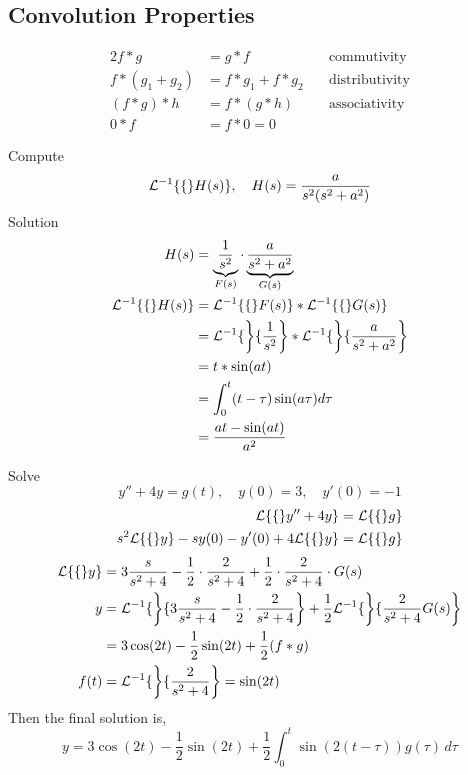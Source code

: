\documentclass[diffeq.tex]{subfiles}
\begin{document}
    \subsection{Convolution Properties}
    \begin{alignat}{2}
        f * g &= g * f & \quad\text{commutivity}\\
        f * (g_{1} + g_{2}) &= f * g_{1} + f * g_{2} & \quad\text{distributivity}\\
        (f * g) * h &= f * (g * h) & \quad\text{associativity}\\
        0 * f &= f * 0 = 0&
    \end{alignat}
    \begin{example}
        Compute
        \begin{equation}
            \mathcal{L}^{-1}\{\{\}H(s)\},\quad H(s) = \frac{a}{s^{2}(s^{2} + a^{2})}
        \end{equation}
        Solution
        \begin{alignat}{1}
            H(s) &= \underbrace{\frac{1}{s^{2}}}_{F(s)} \cdot \underbrace{\frac{a}{s^{2} + a^{2}}}_{G(s)}\\
            \mathcal{L}^{-1}\{\{\}H(s)\} &= \mathcal{L}^{-1}\{\{\}F(s)\} * \mathcal{L}^{-1}\{\{\}G(s)\}\\
            &= \mathcal{L}^{-1}\{\left\}\{\frac{1}{s^{2}}\right\}*\mathcal{L}^{-1}\{\left\}\{\frac{a}{s^{2} + a^{2}}\right\}\\
            &= t * \sin(at)\\
            &= \int_{0}^{t}(t-\tau)\sin(a\tau)d\tau\\
            &= \frac{at-\sin(at)}{a^{2}}
        \end{alignat}
    \end{example}
    \begin{example}
        Solve
        \begin{equation}
            y'' + 4y = g(t),\quad y(0) = 3,\quad y'(0) = -1
        \end{equation}
        \begin{alignat}{1}
            \mathcal{L}\{\{\}y'' + 4y\} &= \mathcal{L}\{\{\}g\}\\
            s^{2}\mathcal{L}\{\{\}y\} - sy(0) - y'(0) + 4\mathcal{L}\{\{\}y\} &= \mathcal{L}\{\{\}g\}
        \end{alignat}
        \begin{alignat}{1}
            \mathcal{L}\{\{\}y\} &= 3\frac{s}{s^{2} + 4} - \frac{1}{2}\cdot\frac{2}{s^{2} + 4} + \frac{1}{2} \cdot \frac{2}{s^{2} + 4} \cdot G(s)\\
            y &= \mathcal{L}^{-1}\{\left\}\{3\frac{s}{s^{2} + 4} - \frac{1}{2}\cdot\frac{2}{s^{2} + 4}\right\} + \frac{1}{2}\mathcal{L}^{-1}\{\left\}\{\frac{2}{s^{2} + 4}G(s)\right\}\\
            &= 3\cos(2t)-\frac{1}{2}\sin(2t)+\frac{1}{2}(f * g)\\
            f(t) &= \mathcal{L}^{-1}\{\left\}\{\frac{2}{s^{2} + 4}\right\} = \sin(2t)
        \end{alignat}
        Then the final solution is,
        \begin{equation}
            y = 3\cos(2t) - \frac{1}{2}\sin(2t) + \frac{1}{2}\int_{0}^{t}\sin(2(t - \tau))g(\tau)\,d\tau
        \end{equation}
    \end{example}
\end{document}

